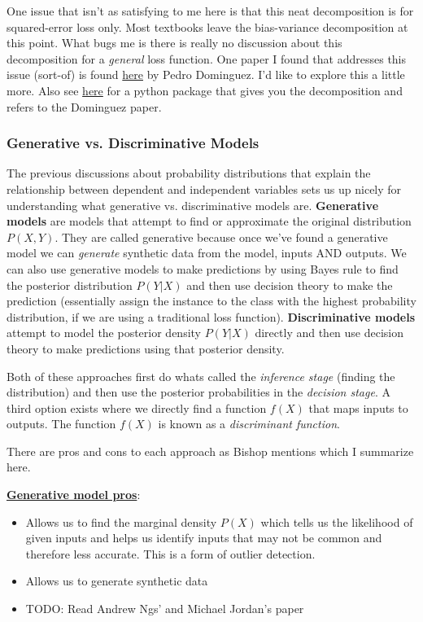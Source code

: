 \documentclass[paper=a4, fontsize=11pt]{scrartcl} %
\numberwithin{equation}{section} %
\numberwithin{figure}{section} %
\numberwithin{table}{section} %
\begin{document}
One issue that isn't as satisfying to me here is that this neat decomposition is for squared-error loss only. Most textbooks leave the bias-variance decomposition at this point. What bugs me is there is really no discussion about this decomposition for a \emph{general} loss function. One paper I found that addresses this issue (sort-of) is found \href{https://homes.cs.washington.edu/~pedrod/bvd.pdf}{here} by Pedro Dominguez. I'd like to explore this a little more. Also see \href{https://github.com/rasbt/mlxtend/blob/master/docs/sources/user_guide/evaluate/bias_variance_decomp.ipynb?utm_campaign=Data_Elixir&utm_source=Data_Elixir_210}{here} for a python package that gives you the decomposition and refers to the Dominguez paper.




\subsubsection{Generative vs. Discriminative Models}

The previous discussions about probability distributions that explain the relationship between dependent and independent variables sets us up nicely for understanding what generative vs. discriminative models are. \textbf{Generative models} are models that attempt to find or approximate the original distribution $P(X,Y)$. They are called generative because once we've found a generative model we can \emph{generate} synthetic data from the model, inputs AND outputs. We can also use generative models to make predictions by using Bayes rule to find the posterior distribution $P(Y|X)$ and then use decision theory to make the prediction (essentially assign the instance to the class with the highest probability distribution, if we are using a traditional loss function). \textbf{Discriminative models} attempt to model the posterior density $P(Y|X)$ directly and then use decision theory to make predictions using that posterior density. 

Both of these approaches first do whats called the \emph{inference stage} (finding the distribution) and then use the posterior probabilities in the \emph{decision stage}. A third option exists where we directly find a function $f(X)$ that maps inputs to outputs. The function $f(X)$ is known as a \emph{discriminant function}.

There are pros and cons to each approach as Bishop mentions which I summarize here.
\break

\noindent \underline{\textbf{Generative model pros}}:
\begin{itemize}
\item Allows us to find the marginal density $P(X)$ which tells us the likelihood of given inputs and helps us identify inputs that may not be common and therefore less accurate. This is a form of outlier detection.
\item Allows us to generate synthetic data
\item TODO: Read Andrew Ngs' and Michael Jordan's paper
\end{itemize}
\end{document}
